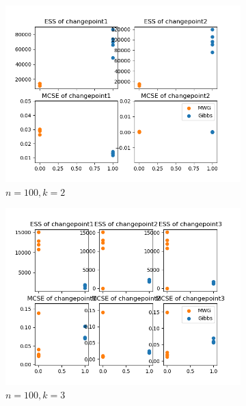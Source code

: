 \begin{figure}[H]
\begin{subfigure}{.3\textwidth}
    	\includegraphics[width=\linewidth]{../../plots/ess_se_M3_N100_NMCMC3_seed0_diffind2.png}
    	\caption{$n=100, k=2$}
	\end{subfigure}
	\begin{subfigure}{.3\textwidth}
	    \centering
    	\includegraphics[width=\linewidth]{../../plots/ess_se_M4_N100_NMCMC3_seed0_diffind2.png}
    	\caption{$n=100, k=3$}
	\end{subfigure}
	\begin{subfigure}{.3\textwidth}
	    \centering

\end{subfigure}
\end{figure}

